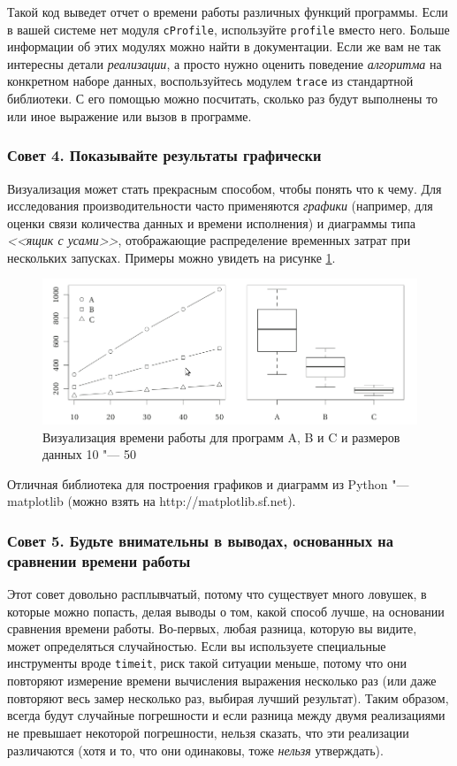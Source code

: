 Такой код выведет отчет о времени работы различных функций программы. Если в вашей системе нет модуля \texttt{cProfile}, используйте \texttt{profile} вместо него. Больше информации об этих модулях можно найти в документации. Если же вам не так интересны детали \textit{реализации}, а просто нужно оценить поведение \textit{алгоритма} на конкретном наборе данных, воспользуйтесь модулем \texttt{trace} из стандартной библиотеки. С его помощью можно посчитать, сколько раз будут выполнены то или иное выражение или вызов в программе.

\subsubsection*{Совет 4. Показывайте результаты графически}

Визуализация может стать прекрасным способом, чтобы понять что к чему. Для исследования производительности часто применяются \textit{графики} (например, для оценки связи количества данных и времени исполнения) и диаграммы типа \textit{<<ящик с усами>>}, отображающие распределение временных затрат при нескольких запусках. Примеры можно увидеть на рисунке \ref{fig:evaluation-diagrams}.

\begin{figure}[h]
	\centering
	\includegraphics[width=\textwidth]{img/2-2.png}
	\caption{Визуализация времени работы для программ A, B и C и размеров данных 10 "--- 50}
	\label{fig:evaluation-diagrams}
\end{figure}

Отличная библиотека для построения графиков и диаграмм из Python "--- matplotlib (можно взять на http://matplotlib.sf.net).

\subsubsection*{Совет 5. Будьте внимательны в выводах, основанных на сравнении времени работы}

Этот совет довольно расплывчатый, потому что существует много ловушек, в которые можно попасть, делая выводы о том, какой способ лучше, на основании сравнения времени работы. Во-первых, любая разница, которую вы видите, может определяться случайностью. Если вы используете специальные инструменты вроде \texttt{timeit}, риск такой ситуации меньше, потому что они повторяют измерение времени вычисления выражения несколько раз (или даже повторяют весь замер несколько раз, выбирая лучший результат). Таким образом, всегда будут случайные погрешности и если разница между двумя реализациями не превышает некоторой погрешности, нельзя сказать, что эти реализации различаются (хотя и то, что они одинаковы, тоже \textit{нельзя} утверждать).

